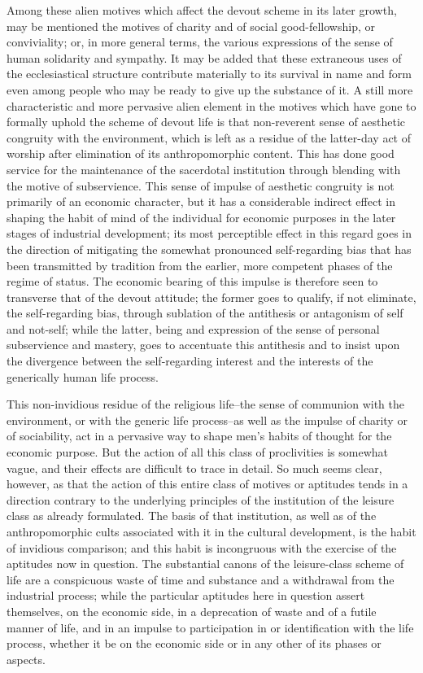 \documentclass[12pt]{report}
\begin{document}
Among these alien motives which affect the devout scheme in its
later growth, may be mentioned the motives of charity and of social
good-fellowship, or conviviality; or, in more general terms, the various
expressions of the sense of human solidarity and sympathy. It may
be added that these extraneous uses of the ecclesiastical structure
contribute materially to its survival in name and form even among
people who may be ready to give up the substance of it. A still more
characteristic and more pervasive alien element in the motives
which have gone to formally uphold the scheme of devout life is that
non-reverent sense of aesthetic congruity with the environment, which is
left as a residue of the latter-day act of worship after elimination
of its anthropomorphic content. This has done good service for the
maintenance of the sacerdotal institution through blending with the
motive of subservience. This sense of impulse of aesthetic congruity
is not primarily of an economic character, but it has a considerable
indirect effect in shaping the habit of mind of the individual for
economic purposes in the later stages of industrial development;
its most perceptible effect in this regard goes in the direction of
mitigating the somewhat pronounced self-regarding bias that has been
transmitted by tradition from the earlier, more competent phases of the
regime of status. The economic bearing of this impulse is therefore seen
to transverse that of the devout attitude; the former goes to qualify,
if not eliminate, the self-regarding bias, through sublation of the
antithesis or antagonism of self and not-self; while the latter, being
and expression of the sense of personal subservience and mastery, goes
to accentuate this antithesis and to insist upon the divergence between
the self-regarding interest and the interests of the generically human
life process.

This non-invidious residue of the religious life--the sense of communion
with the environment, or with the generic life process--as well as the
impulse of charity or of sociability, act in a pervasive way to shape
men's habits of thought for the economic purpose. But the action of
all this class of proclivities is somewhat vague, and their effects are
difficult to trace in detail. So much seems clear, however, as that the
action of this entire class of motives or aptitudes tends in a direction
contrary to the underlying principles of the institution of the leisure
class as already formulated. The basis of that institution, as well
as of the anthropomorphic cults associated with it in the cultural
development, is the habit of invidious comparison; and this habit is
incongruous with the exercise of the aptitudes now in question. The
substantial canons of the leisure-class scheme of life are a conspicuous
waste of time and substance and a withdrawal from the industrial
process; while the particular aptitudes here in question assert
themselves, on the economic side, in a deprecation of waste and of
a futile manner of life, and in an impulse to participation in or
identification with the life process, whether it be on the economic side
or in any other of its phases or aspects.
\end{document}
